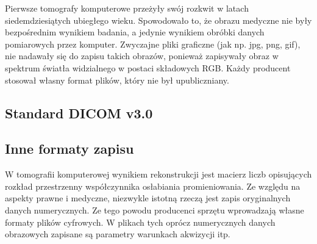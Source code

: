 
\par
Pierwsze tomografy komputerowe przeżyły swój rozkwit w latach siedemdziesiątych ubiegłego wieku.
Spowodowało to, że obrazu medyczne nie były bezpośrednim wynikiem badania, a jedynie wynikiem obróbki danych pomiarowych przez komputer.
Zwyczajne pliki graficzne (jak np. jpg, png, gif), nie nadawały się do zapisu takich obrazów, ponieważ zapisywały obraz w spektrum światła widzialnego w postaci składowych RGB.
Każdy producent stosował  własny format plików, który nie był upubliczniany.

\subsection{Standard DICOM v3.0}


\subsection{Inne formaty zapisu}

\par
W tomografii komputerowej wynikiem rekonstrukcji jest macierz liczb opisujących rozkład przestrzenny współczynnika osłabiania promieniowania.
Ze względu na aspekty prawne i medyczne, niezwykle istotną rzeczą jest zapis oryginalnych danych numerycznych. Ze tego powodu producenci sprzętu wprowadzają własne formaty plików cyfrowych.
W plikach tych oprócz numerycznych danych obrazowych zapisane są parametry warunkach akwizycji itp.